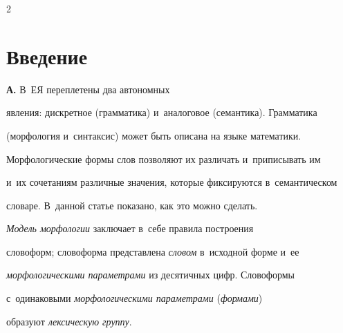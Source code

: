      





  









\thispagestyle{headings}



\begin{multicols}{2}



\label{st\stat}

    

\section{Введение}



    \textbf{А.} В~ЕЯ переплетены два автономных 

явления: дискретное (грамматика) и~аналоговое (семантика). Грамматика 

(морфология и~синтаксис) может быть описана на языке математики. 

Морфологические формы слов позволяют их различать и~приписывать им 

и~их сочетаниям различные значения, которые фиксируются в~семантическом 

словаре. В~данной статье показано, как это можно сделать.

    

    \textit{Модель морфологии} заключает в~себе правила построения 

словоформ; словоформа представлена \textit{словом} в~исходной форме и~ее 

\textit{морфологическими параметрами} из десятичных цифр. Словоформы 

с~одинаковыми \textit{морфологическими параметрами} (\textit{формами}) 

образуют \textit{лексическую группу}. 

    


\end{multicols}

